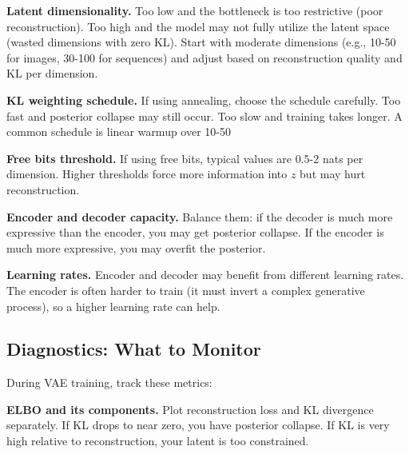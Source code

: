 \textbf{Latent dimensionality.} Too low and the bottleneck is too restrictive (poor reconstruction). Too high and the model may not fully utilize the latent space (wasted dimensions with zero KL). Start with moderate dimensions (e.g., 10-50 for images, 30-100 for sequences) and adjust based on reconstruction quality and KL per dimension.

\vspace{0.3cm}

\textbf{KL weighting schedule.} If using annealing, choose the schedule carefully. Too fast and posterior collapse may still occur. Too slow and training takes longer. A common schedule is linear warmup over 10-50%

\vspace{0.3cm}

\textbf{Free bits threshold.} If using free bits, typical values are 0.5-2 nats per dimension. Higher thresholds force more information into $z$ but may hurt reconstruction.

\vspace{0.3cm}

\textbf{Encoder and decoder capacity.} Balance them: if the decoder is much more expressive than the encoder, you may get posterior collapse. If the encoder is much more expressive, you may overfit the posterior.

\vspace{0.3cm}

\textbf{Learning rates.} Encoder and decoder may benefit from different learning rates. The encoder is often harder to train (it must invert a complex generative process), so a higher learning rate can help.

\vspace{1.5em}

\subsection{Diagnostics: What to Monitor}

During VAE training, track these metrics:

\vspace{0.3cm}

\textbf{ELBO and its components.} Plot reconstruction loss and KL divergence separately. If KL drops to near zero, you have posterior collapse. If KL is very high relative to reconstruction, your latent is too constrained.

\vspace{0.3cm}


